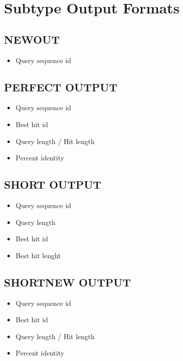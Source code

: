 \documentclass[letterpaper,10pt,english]{sphinxmanual}
\begin{document}
\section{Subtype Output Formats}
\label{defs:subtype-output-formats}

\subsection{NEWOUT}
\label{defs:newout}\label{defs:id11}\begin{itemize}
\item {} 
Query sequence id

\end{itemize}


\subsection{PERFECT OUTPUT}
\label{defs:perfect-output}\label{defs:perfectout}\begin{itemize}
\item {} 
Query sequence id

\item {} 
Best hit id

\item {} 
Query length / Hit length

\item {} 
Percent identity

\end{itemize}


\subsection{SHORT OUTPUT}
\label{defs:short-output}\label{defs:shortout}\begin{itemize}
\item {} 
Query sequence id

\item {} 
Query length

\item {} 
Best hit id

\item {} 
Best hit lenght

\end{itemize}


\subsection{SHORTNEW OUTPUT}
\label{defs:shortnewout}\label{defs:shortnew-output}\begin{itemize}
\item {} 
Query sequence id

\item {} 
Best hit id

\item {} 
Query length / Hit length

\item {} 
Percent identity

\end{itemize}
\end{document}

